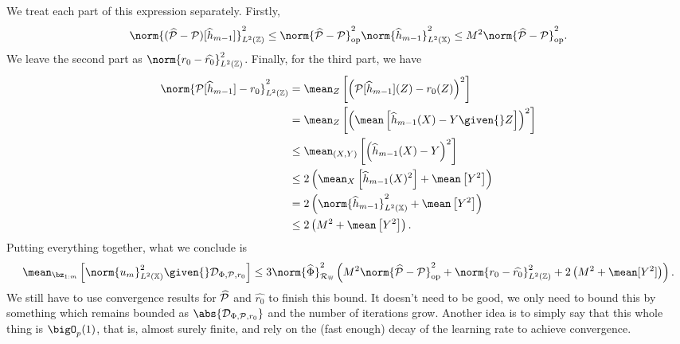 We treat each part of this expression separately.
Firstly,
\begin{align*}
    \norm{ ( \hat{ \meanop } - \meanop ) [ \hat{ h }_{ m-1 } ] }_{ L^2 ( \mathbb{Z} ) }^2
    \leq \norm{ \hat{ \meanop } - \meanop }_{ \mathrm{op} }^2 \norm{ \hat{ h }_{ m-1 } }_{ L^2 ( \mathbb{X} ) }^2
    \leq M^2 \norm{ \hat{ \meanop } - \meanop }_{ \mathrm{op} }^2
.\end{align*}
We leave the second part as $ \norm{ r_{ 0 } - \hat{ r_{ 0 } } }_{ L^{ 2 } ( \mathbb{Z} ) }^2 $.
Finally, for the third part, we have
\begin{align*}
    \norm{ \meanop [ \hat{ h }_{ m-1 } ] - r_{ 0 } }_{ L^2 ( \mathbb{Z} ) }^2
    &= \mean_{ Z } \left[
        \left(
            \meanop [ \hat{ h }_{ m-1 } ] ( Z ) - r_{ 0 } ( Z )
        \right)^2
    \right] \\
    &= \mean_{ Z } \left[
        \left(
            \mean \left[ \hat{ h }_{ m-1 } ( X ) - Y \given{} Z \right]
        \right)^2
    \right] \\
    &\leq \mean_{ ( X, Y ) } \left[
        \left(
            \hat{ h }_{ m-1 } ( X ) - Y
        \right)^2
    \right] \\
    &\leq 2 \left(
        \mean_{ X } \left[ \hat{ h }_{ m-1 } ( X )^2 \right]
        + \mean \left[ Y^2 \right]
    \right) \\
    &= 2 \left(
        \norm{ \hat{ h }_{ m-1 } }_{ L^2 ( \mathbb{X} ) }^2
        + \mean \left[ Y^2 \right]
    \right) \\
    &\leq 2 \left( M^2 + \mean \left[ Y^2 \right] \right)
.\end{align*}
Putting everything together, what we conclude is
\begin{align*}
    \mean_{ \bz_{ 1:m } } \left[
        \norm{ u_{ m } }_{ L^2 ( \mathbb{X} ) }^2 \given{} \dataoff
    \right]
    \leq
    3 \norm{ \hat{ \Phi } }_{ \rkhsw }^2 \left(
        M^2 \norm{ \hat{ \meanop } - \meanop }_{ \mathrm{op} }^2
        + \norm{ r_{ 0 } - \hat{ r_{ 0 } } }_{ L^2 ( \mathbb{Z} ) }^2
        + 2 \left( M^2 + \mean [ Y^2 ] \right)
    \right)
.\end{align*}
{\color{red} We still have to use convergence results for $ \widehat{ \mathcal{P} } $ and $ \hat{ r_{ 0 } } $ to finish this bound.
It doesn't need to be good, we only need to bound this by something which remains bounded as $ \abs{ \dataoff } $ and the number of iterations grow.
Another idea is to simply say that this whole thing is $ \bigO_{ p } ( 1 ) $, that is, almost surely finite, and rely on the (fast enough) decay of the learning rate to achieve convergence.}

